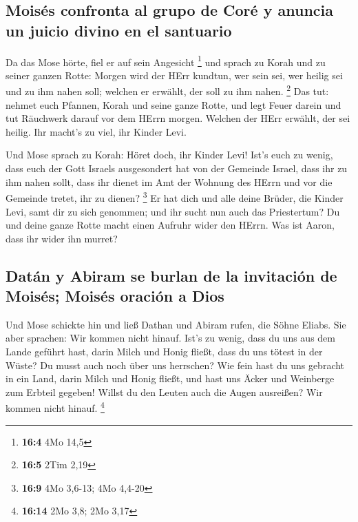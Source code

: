 \hypertarget{moisuxe9s-confronta-al-grupo-de-coruxe9-y-anuncia-un-juicio-divino-en-el-santuario}{%
\subsection{Moisés confronta al grupo de Coré y anuncia un juicio divino
en el
santuario}\label{moisuxe9s-confronta-al-grupo-de-coruxe9-y-anuncia-un-juicio-divino-en-el-santuario}}

 Da das Mose hörte, fiel er auf sein Angesicht \footnote{\textbf{16:4}
  4Mo 14,5}  und sprach zu Korah und zu seiner ganzen
Rotte: Morgen wird der HErr kundtun, wer sein sei, wer heilig sei und zu
ihm nahen soll; welchen er erwählt, der soll zu ihm nahen. \footnote{\textbf{16:5}
  2Tim 2,19}  Das tut: nehmet euch Pfannen, Korah und
seine ganze Rotte,  und legt Feuer darein und tut
Räuchwerk darauf vor dem HErrn morgen. Welchen der HErr erwählt, der sei
heilig. Ihr macht's zu viel, ihr Kinder Levi.

 Und Mose sprach zu Korah: Höret doch, ihr Kinder Levi!
 Ist's euch zu wenig, dass euch der Gott Israels
ausgesondert hat von der Gemeinde Israel, dass ihr zu ihm nahen sollt,
dass ihr dienet im Amt der Wohnung des HErrn und vor die Gemeinde
tretet, ihr zu dienen? \footnote{\textbf{16:9} 4Mo 3,6-13; 4Mo 4,4-20}
 Er hat dich und alle deine Brüder, die Kinder Levi, samt
dir zu sich genommen; und ihr sucht nun auch das Priestertum?
 Du und deine ganze Rotte macht einen Aufruhr wider den
HErrn. Was ist Aaron, dass ihr wider ihn murret?

\hypertarget{datuxe1n-y-abiram-se-burlan-de-la-invitaciuxf3n-de-moisuxe9s-moisuxe9s-oraciuxf3n-a-dios}{%
\subsection{Datán y Abiram se burlan de la invitación de Moisés; Moisés
oración a
Dios}\label{datuxe1n-y-abiram-se-burlan-de-la-invitaciuxf3n-de-moisuxe9s-moisuxe9s-oraciuxf3n-a-dios}}

 Und Mose schickte hin und ließ Dathan und Abiram rufen,
die Söhne Eliabs. Sie aber sprachen: Wir kommen nicht hinauf.
 Ist's zu wenig, dass du uns aus dem Lande geführt hast,
darin Milch und Honig fließt, dass du uns tötest in der Wüste? Du musst
auch noch über uns herrschen?  Wie fein hast du uns
gebracht in ein Land, darin Milch und Honig fließt, und hast uns Äcker
und Weinberge zum Erbteil gegeben! Willst du den Leuten auch die Augen
ausreißen? Wir kommen nicht hinauf. \footnote{\textbf{16:14} 2Mo 3,8;
  2Mo 3,17}

